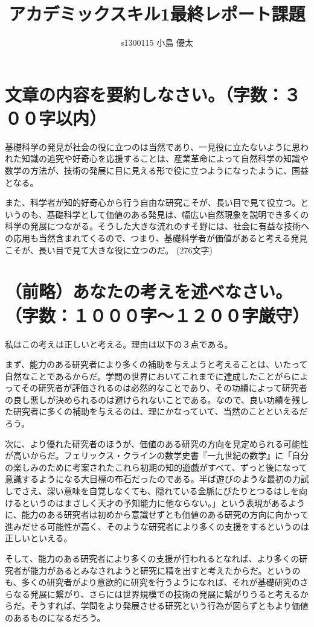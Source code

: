 \documentclass[platex,a4paper,12pt,dvipdfmx]{jsarticle}
\title{アカデミックスキル1最終レポート課題}
\author{s1300115 小島 優太}
\begin{document}
\maketitle

\newpage
\section{文章の内容を要約しなさい。（字数：３００字以内）}

基礎科学の発見が社会の役に立つのは当然であり、一見役に立たないように思われた知識の追究や好奇心を応援することは、産業革命によって自然科学の知識や数学の方法が、技術の発展に目に見える形で役に立つようになったように、国益となる。

また、科学者が知的好奇心から行う自由な研究こそが、長い目で見て役立つ。というのも、基礎科学として価値のある発見は、幅広い自然現象を説明でき多くの科学の発展につながる。そうした大きな流れのすそ野には、社会に有益な技術への応用も当然含まれてくるので、つまり、基礎科学者が価値があると考える発見こそが、長い目で見て大きな役に立つのだ。
(276文字)

\section{（前略）あなたの考えを述べなさい。（字数：１０００字～１２００字厳守）}
私はこの考えは正しいと考える。理由は以下の３点である。

まず、能力のある研究者により多くの補助を与えようと考えることは、いたって自然なことであるからだ。学問の世界においてこれまでに達成したことがらによってその研究者が評価されるのは必然的なことであり、その功績によって研究者の良し悪しが決められるのは避けられないことである。なので、良い功績を残した研究者に多くの補助を与えるのは、理にかなっていて、当然のことといえるだろう。

次に、より優れた研究者のほうが、価値のある研究の方向を見定められる可能性が高いからだ。フェリックス・クラインの数学史書『一九世紀の数学』に「自分の楽しみのために考案されたこれら初期の知的遊戯がすべて、ずっと後になって意識するようになる大目標の布石だったのである。半ば遊びのような最初の力試しでさえ、深い意味を自覚しなくても、隠れている金脈にぴたりとつるはしを向けるというのはまさしく天才の予知能力に他ならない。」という表現があるように、能力のある研究者は初めから意識せずとも価値のある研究の方向に向かって進みだせる可能性が高く、そのような研究者により多くの支援をするというのは正しいといえる。

そして、能力のある研究者により多くの支援が行われるとなれば、より多くの研究者が能力があるとみなされようと研究に精を出すと考えたからだ。というのも、多くの研究者がより意欲的に研究を行うようになれば、それが基礎研究のさらなる発展に繋がり、さらには世界規模での技術の発展に繋がりうると考えるからだ。そうすれば、学問をより発展させる研究という行為が図らずともより価値のあるものになるだろう。
\end{document}
